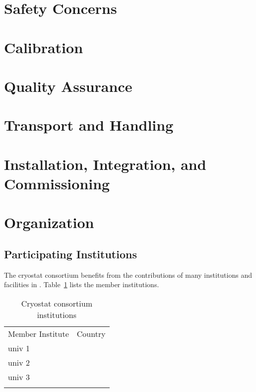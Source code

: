\section{Safety Concerns}
\label{sec:cryost-safety}

\section{Calibration}
\label{sec:cryost-calib}

\section{Quality Assurance}
\label{sec:cryost-qa}


\section{Transport and Handling}
\label{sec:cryost-transport}

\section{Installation, Integration, and Commissioning}
\label{sec:cryost-iic}

\section{Organization}
\label{sec:cryost-org}

\subsection{Participating Institutions}
\label{sec:fdsp-org-inst}

The cryostat consortium benefits from the contributions of many institutions and facilities in .  Table~\ref{tab:cryost-institutes}
lists the member institutions. 

\begin{longtable}
{ll}
\caption{Cryostat consortium institutions}\\ \colhline
\rowcolor{dunetablecolor} Member Institute  &  Country       \\  \toprowrule
univ 1 &  \\ \colhline
univ 2 &  \\ \colhline
univ 3 &  \\ 
\label{tab:cryost-institutes}
\end{longtable}












